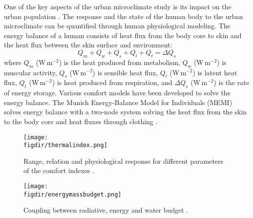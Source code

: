 One of the key aspects of the urban microclimate study is its impact on the urban population \citep{Oke2017a,Saneinejad2013}. The response and the state of the human body to the urban microclimate can be quantified through human physiological modeling. The energy balance of a human consists of heat flux from the body core to skin and the heat flux between the skin surface and environment:
	\begin{equation}
	Q_m + Q_w + Q_s + Q_l + Q_t =  \Delta Q_s
	\end{equation}
where $Q_m$ (W\,m$^{-2}$) is the heat produced from metabolism, $Q_w$ (W\,m$^{-2}$) is muscular activity, $Q_s$ (W\,m$^{-2}$) is sensible heat flux, $Q_l$ (W\,m$^{-2}$) is latent heat flux, $Q_t$ (W\,m$^{-2}$) is heat produced from respiration, and $\Delta Q_s$ (W\,m$^{-2}$) is the rate of energy storage. Various comfort models have been developed to solve the energy balance. The Munich Energy-Balance Model for Individuals (MEMI) solves energy balance with a two-node system solving the heat flux from the skin to the body core and heat fluxes through clothing \citep{Hoppe1999}. 

	\begin{figure}[p]
		\centering
		\texttt{[image: \\figdir/thermalindex.png]}
		\caption{Range, relation and physiological response for different parameters of the comfort indexes \citep{Oke2017a,Matzarakis1999,Bazejczyk2013}.}
		\label{fig:thermalindex}
	\end{figure}
	
	\begin{figure}[p]
	\centering
	\texttt{[image: \\figdir/energymassbudget.png]}
	\caption{Coupling between radiative, energy and water budget \citep{Sawinski2011}.}
	\label{fig:energymassbudget}
	\end{figure}


